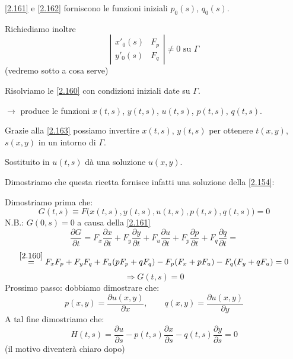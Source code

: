 \documentclass[a4paper,11pt]{report}
\begin{document}
\eqref{2.161} e \eqref{2.162} forniscono le funzioni iniziali $p_0(s)$, $q_0(s)$.

Richiediamo inoltre
\begin{equation}
\left| \begin{matrix}
x'_0(s) & F_p\\
y'_0(s) & F_q
\end{matrix}\right| \neq 0 \text{ su } \Gamma
\label{2.163}
\end{equation}
(vedremo sotto a cosa serve)

Risolviamo le \eqref{2.160} con condizioni iniziali date su $\Gamma$.

$\rightarrow$ produce le funzioni $x(t,s)$, $y(t,s)$, $u(t,s)$, $p(t,s)$, $q(t,s)$.

Grazie alla \eqref{2.163} possiamo invertire $x(t,s)$, $y(t,s)$ per ottenere $t(x,y)$, $s(x,y)$ in un intorno di $\Gamma$. 

Sostituito in $u(t,s)$ d\`a una soluzione $u(x,y)$.

\medskip

Dimostriamo che questa ricetta fornisce infatti una soluzione della \eqref{2.154}:

Dimostriamo prima che:
\[
G(t,s) \equiv F\big(x(t,s),y(t,s),u(t,s),p(t,s),q(t,s)\big)=0
\]
N.B.: $G(0,s)=0$ a causa della \eqref{2.161}
\[
\frac{\partial G}{\partial t} = F_x \frac{\partial x}{\partial t} + F_y \frac{\partial y}{\partial t} + F_u \frac{\partial u}{\partial t} + F_p \frac{\partial p}{\partial t} + F_q \frac{\partial q}{\partial t}=
\]
\[
\overset{\eqref{2.160}}{=}F_xF_p + F_y F_q + F_u(pF_p + qF_q) - F_p(F_x + pF_u) - F_q(F_y + qF_u)=0
\]
\[
\Rightarrow G(t,s)=0
\]
Prossimo passo: dobbiamo dimostrare che:
\[
p(x,y)=\frac{\partial u(x,y)}{\partial x}, \qquad q(x,y)=\frac{\partial u(x,y)}{\partial y}
\]
A tal fine dimostriamo che:
\begin{equation}
H(t,s)=\frac{\partial u}{\partial s} - p(t,s)\frac{\partial x}{\partial s} - q(t,s) \frac{\partial y}{\partial s} =0 
\label{2.164}
\end{equation}
(il motivo diventer\`a chiaro dopo)
\end{document}
